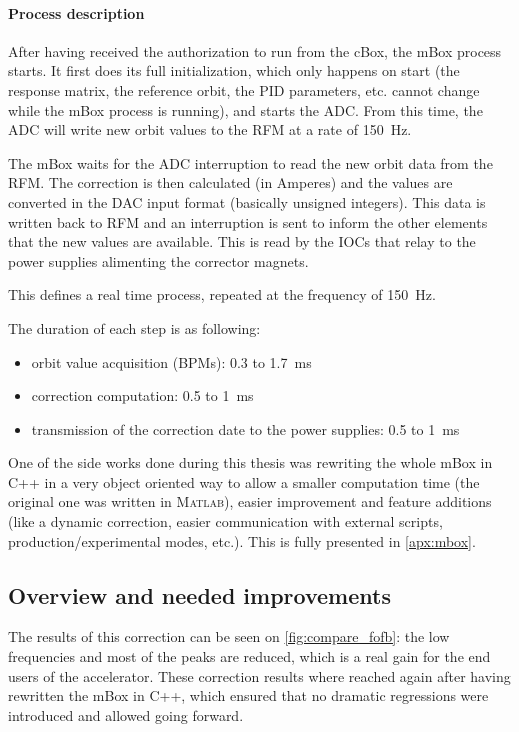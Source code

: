 \paragraph{Process description}
After having received the authorization to run from the cBox, the mBox process starts. It first does its full initialization, which only happens on start (the response matrix, the reference orbit, the PID parameters, etc. cannot change while the mBox process is running), and starts the ADC. From this time, the ADC will write new orbit values to the RFM at a rate of \SI{150}{\hertz}.

The mBox waits for the ADC interruption to read the new orbit data from the RFM. The correction is then calculated (in Amperes) and the values are converted in the DAC input format (basically unsigned integers). This data is written back to RFM and an interruption is sent to inform the other elements that the new values are available. This is read by the IOCs that relay to the power supplies alimenting the corrector magnets.

This defines a real time process, repeated at the frequency of \SI{150}{\hertz}.

The duration of each step is as following:
\begin{itemize}
\item orbit value acquisition (BPMs): 0.3 to \SI{1.7}{\milli\second}
\item correction computation: 0.5 to \SI{1}{\milli\second}
\item transmission of the correction date to the power supplies: 0.5 to \SI{1}{\milli\second}
\end{itemize}

\remark One of the side works done during this thesis was rewriting the whole mBox in C++ in a very object oriented way to allow a smaller computation time (the original one was written in \textsc{Matlab}), easier improvement and feature additions (like a dynamic correction, easier communication with external scripts, production/experimental modes, etc.). This is fully presented in \cref{apx:mbox}.

\subsection{Overview and needed improvements}
The results of this correction can be seen on \cref{fig:compare_fofb}: the low frequencies and most of the peaks are reduced, which is a real gain for the end users of the accelerator. These correction results where reached again after having rewritten the mBox in C++, which ensured that no dramatic regressions were introduced and allowed going forward.

